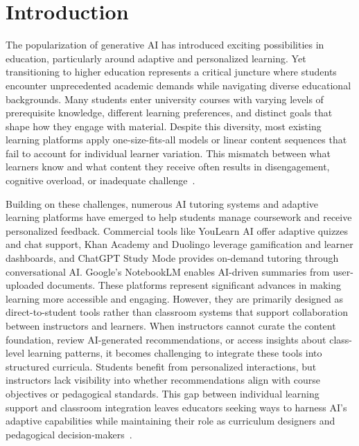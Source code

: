 \documentclass{stylefiles/capstone}
\begin{document}

\maketitle

\section{Introduction}

The popularization of generative AI has introduced exciting possibilities in education, particularly around adaptive and personalized learning. Yet transitioning to higher education represents a critical juncture where students encounter unprecedented academic demands while navigating diverse educational backgrounds. Many students enter university courses with varying levels of prerequisite knowledge, different learning preferences, and distinct goals that shape how they engage with material. Despite this diversity, most existing learning platforms apply one-size-fits-all models or linear content sequences that fail to account for individual learner variation. This mismatch between what learners know and what content they receive often results in disengagement, cognitive overload, or inadequate challenge~\cite{ausubel1978educational}.

Building on these challenges, numerous AI tutoring systems and adaptive learning platforms have emerged to help students manage coursework and receive personalized feedback. Commercial tools like YouLearn AI offer adaptive quizzes and chat support, Khan Academy and Duolingo leverage gamification and learner dashboards, and ChatGPT Study Mode provides on-demand tutoring through conversational AI. Google's NotebookLM enables AI-driven summaries from user-uploaded documents. These platforms represent significant advances in making learning more accessible and engaging. However, they are primarily designed as direct-to-student tools rather than classroom systems that support collaboration between instructors and learners. When instructors cannot curate the content foundation, review AI-generated recommendations, or access insights about class-level learning patterns, it becomes challenging to integrate these tools into structured curricula. Students benefit from personalized interactions, but instructors lack visibility into whether recommendations align with course objectives or pedagogical standards. This gap between individual learning support and classroom integration leaves educators seeking ways to harness AI's adaptive capabilities while maintaining their role as curriculum designers and pedagogical decision-makers~\cite{Herrmann-Werner2024,chaudhry2022transparencyindexframeworkai,mollick2023using}.
\end{document}
